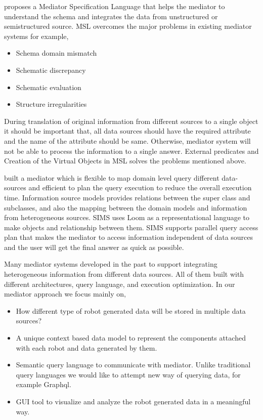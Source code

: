\documentclass[12pt]{article}
\begin{document}
\citet{papakonstantinou1996medmaker} proposes a Mediator Specification Language that helps the mediator to understand the schema and integrates the data from unstructured or semistructured source. MSL overcomes the major problems in existing mediator systems for example,
\begin{itemize}
	\item Schema domain mismatch 
	\item Schematic discrepancy
	\item Schematic evaluation
	\item Structure irregularities
\end{itemize}

During translation of original information from different sources to a single object it should be important that, all data sources should have the required attribute and the name of the attribute should be same. Otherwise, mediator system will not be able to process the information to a single answer.  External predicates and Creation of the Virtual Objects in MSL solves the problems mentioned above.

\citet{arens1996query} built a mediator which is flexible to map domain level query different data-sources and efficient to plan the query execution to reduce the overall execution time. Information source models provides relations between the super class and subclasses, and also the mapping between the domain models and information from heterogeneous sources. SIMS uses Loom as a representational language to make objects and relationship between them. SIMS supports parallel query access plan that makes the mediator to access information independent of data sources and the user will get the final answer as quick as possible.

Many mediator systems developed in the past to support integrating heterogeneous information from different data sources. All of them built with different architectures, query language, and execution optimization. In our mediator approach we focus mainly on,
\begin{itemize}
	\item How different type of robot generated data will be stored in multiple data sources?
	\item A unique context based data model to represent the components attached with each robot and data generated by them.
	\item Semantic query language to communicate with mediator. Unlike traditional query languages we would like to attempt new way of querying data, for example Graphql.
	\item GUI tool to visualize and analyze the robot generated data in a meaningful way.
\end{itemize} 
\end{document}
